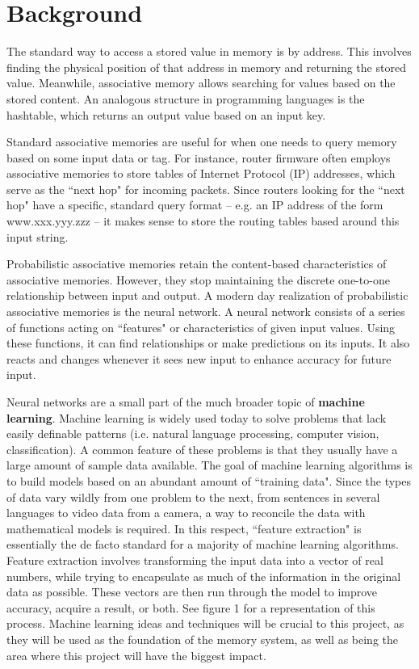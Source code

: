 \documentclass{sig-alternate}
\begin{document}
\section{Background}
\label{sec:intro}

The standard way to access a stored value in memory is by address. 
This involves finding the physical position of that address in memory
and returning the stored value. Meanwhile, associative memory allows
searching for values based on the stored content. An analogous structure
in programming languages is the hashtable, which returns an output value
based on an input key. 

Standard associative memories are useful for when one needs to query memory based 
on some input data or tag. For instance, router firmware often employs associative 
memories to store tables of Internet Protocol (IP) addresses, which serve as the ``next hop" for incoming 
packets. Since routers looking for the ``next hop" have a specific, standard query 
format -- e.g. an IP address of the form www.xxx.yyy.zzz -- it makes sense to store the 
routing tables based around this input string.

Probabilistic associative memories retain the content-based characteristics of associative memories.
However, they stop maintaining the discrete one-to-one relationship between input and output.
A modern day realization of probabilistic associative memories is the neural network. A neural network
consists of a series of functions acting on ``features" or characteristics of given input values. Using
these functions, it can find relationships or make predictions on its inputs. It also
reacts and changes whenever it sees new input to enhance accuracy for future input.

Neural networks are a small part of the much broader topic of \textbf{machine learning}. Machine learning
is widely used today to solve problems that lack easily definable patterns (i.e. natural language processing,
computer vision, classification). A common feature of these problems is that they usually have a large amount
of sample data available. The goal of machine learning algorithms is to build models based on an
abundant amount of ``training data". Since the types of data vary wildly from one problem to the next,
from sentences in several languages to video data from a camera, a way to reconcile the data with
mathematical models is required. In this respect, ``feature extraction" is essentially the de facto
standard for a majority of machine learning algorithms. Feature extraction involves transforming the
input data into a vector of real numbers, while trying to encapsulate as much of the information
in the original data as possible. These vectors are then run through the model to improve accuracy,
acquire a result, or both. See figure 1 for a representation of this process. 
Machine learning ideas and techniques will be crucial to this project,
as they will be used as the foundation of the memory system, as well as being the area where this project
will have the biggest impact.
\end{document}
